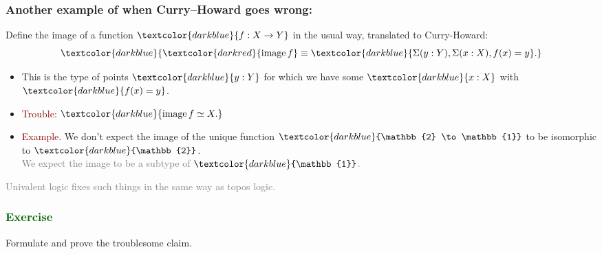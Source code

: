 \documentclass[aspectratio=169]{beamer}
\newcommand{\image}{\operatorname{image}}
\newcommand{\eqq}{\equiv}
\newcommand{\db}{\textcolor{darkblue}}
\newcommand{\dg}{\textcolor{darkgreen}}
\newcommand{\grey}{\textcolor{grey}}
\newcommand{\dr}{\textcolor{darkred}}
\newcommand{\m}[1]{$\db{#1}$}
\newcommand{\M}[1]{\[\db{#1}\]}
\begin{document}
\begin{frame}
  \frametitle{Another example of when Curry--Howard goes wrong: }

Define the image of a function \m{f:X \to Y} in the usual way, translated to Curry-Howard:
\M{\dr{\image f} \eqq \db{\Sigma(y:Y), \Sigma(x:X), f(x)=y}.}

\begin{itemize}
\vfill \item
This is the type of points \m{y:Y} for which we have some \m{x:X} with \m{f(x)=y}.
\vfill \item \dr{Trouble:} \m{\image f \simeq X.} \\[1ex]



\vfill \item \dr{Example.} We don't expect the image of the unique function \m{\mathbb{2} \to \mathbb{1}} to be isomorphic to \m{\mathbb{2}}. \\[1ex]

\grey{We expect the image to be a subtype of \m{\mathbb{1}}.}


\end{itemize}

\vfill

\grey{Univalent logic fixes such things in the same way as topos logic.}

\end{frame}

\begin{frame}
  \frametitle{\dg{Exercise}}

  Formulate and prove the troublesome claim.

\end{frame}
\end{document}
